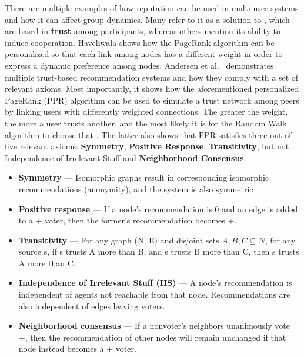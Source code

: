 There are multiple examples of how reputation can be used in multi-user systems and how it can affect group dynamics. Many refer to it as a solution to , which are based in \textbf{trust} among participants, whereas others mention its ability to induce cooperation. Haveliwala \cite{Haveliwala2003} shows how the PageRank algorithm can be personalized so that each link among nodes has a different weight in order to express a dynamic preference among nodes. Andersen et al.\ \cite{Andersen2008} demonstrates multiple trust-based recommendation systems and how they comply with a set of relevant axioms. Most importantly, it shows how the aforementioned personalized PageRank (PPR) algorithm can be used to simulate a trust network among peers by linking users with differently weighted connections. The greater the weight, the more a user trusts another, and the most likely it is for the Random Walk algorithm to choose that . The latter also shows that PPR satisfies three out of five relevant axioms: \textbf{Symmetry}, \textbf{Positive Response}, \textbf{Transitivity}, but not Independence of Irrelevant Stuff and \textbf{Neighborhood Consensus}.
\begin{itemize}
    \item \textbf{Symmetry} --- Isomorphic graphs result in corresponding isomorphic recommendations (anonymity), and the system is also symmetric
    \item \textbf{Positive response} --- If a node’s recommendation is 0 and an edge is added to a + voter, then the former’s recommendation becomes +.
    \item \textbf{Transitivity} --- For any graph (N, E) and disjoint sets $ A, B, C \subseteq N $, for any source s, if s trusts A more than B, and s trusts B more than C, then s trusts A more than C.
    \item \textbf{Independence of Irrelevant Stuﬀ (IIS)} --- A node’s recommendation is independent of agents not reachable from that node. Recommendations are also independent of edges leaving voters.
    \item \textbf{Neighborhood consensus} --- If a nonvoter’s neighbors unanimously vote +, then the recommendation of other nodes will remain unchanged if that node instead becomes a + voter.
\end{itemize}

